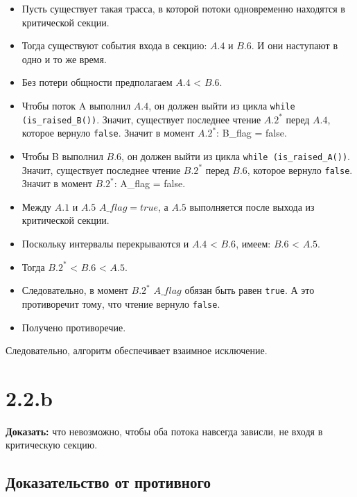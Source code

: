 \documentclass[a4paper,12pt]{article}
\begin{document}
\begin{itemize}

\item Пусть существует такая трасса, в которой потоки одновременно находятся в критической секции.

\item Тогда существуют события входа в секцию: $A.4$ и $B.6$. И они наступают в одно и то же время.

\item Без потери общности предполагаем $A.4$ < $B.6$.

\item Чтобы поток A выполнил $A.4$, он должен выйти из цикла \texttt{while (is\_raised\_B())}.
Значит, существует последнее чтение
$A.2^{\ast}$ перед $A.4$,
которое вернуло \texttt{false}.
Значит в момент $A.2^{\ast}$: B\_flag = false.


\item Чтобы B выполнил $B.6$, он должен выйти из цикла \texttt{while (is\_raised\_A())}.
Значит, существует последнее чтение
$B.2^{\ast}$ перед $B.6$,
которое вернуло \texttt{false}.
Значит в момент $B.2^{\ast}$: A\_flag = false.

\item Между $A.1$ и $A.5$ $A\_flag = true$, а $A.5$ выполняется после выхода из критической секции.

\item Поскольку интервалы перекрываются
и $A.4$ < $B.6$,
имеем: $B.6$ < $A.5$.

\item Тогда $B.2^{\ast}$ < $B.6$ < $A.5$.

\item Следовательно, в момент $B.2^{\ast}$ $A\_flag$ обязан быть равен \texttt{true}.
А это противоречит тому, что чтение вернуло \texttt{false}.

\item Получено противоречие.

\end{itemize}

Следовательно, алгоритм обеспечивает взаимное исключение.

\section*{2.2.b}

\textbf{Доказать:} что невозможно, чтобы оба потока навсегда зависли, не входя в критическую секцию.

\subsection*{Доказательство от противного}
\end{document}
